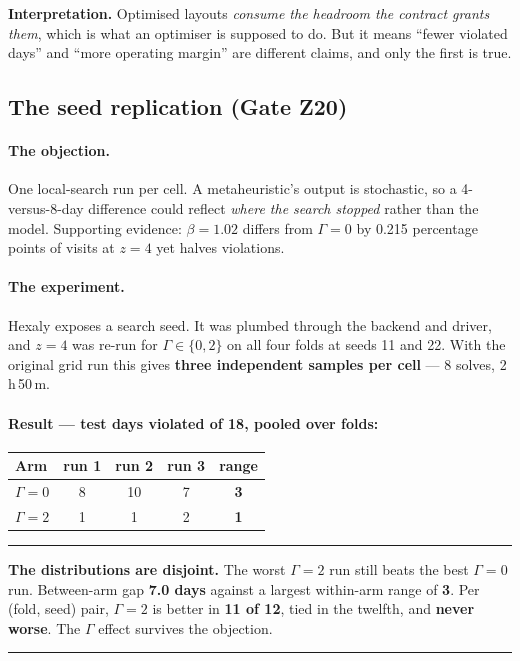 \documentclass[11pt,a4paper]{article}
\newenvironment{keybox}
  {\par\medskip\noindent\rule{\linewidth}{0.9pt}\par\nobreak\smallskip\ignorespaces}
  {\par\smallskip\nobreak\noindent\rule{\linewidth}{0.9pt}\par\medskip}
\begin{document}
\textbf{Interpretation.} Optimised layouts \emph{consume the headroom the
contract grants them}, which is what an optimiser is supposed to do. But it
means ``fewer violated days'' and ``more operating margin'' are different
claims, and only the first is true.

\subsection{The seed replication (Gate Z20)}

\paragraph{The objection.} One local-search run per cell. A metaheuristic's
output is stochastic, so a 4-versus-8-day difference could reflect
\emph{where the search stopped} rather than the model. Supporting evidence:
$\beta{=}1.02$ differs from $\Gamma=0$ by 0.215 percentage points of visits at
$z=4$ yet halves violations.

\paragraph{The experiment.} Hexaly exposes a search seed. It was plumbed
through the backend and driver, and $z=4$ was re-run for $\Gamma\in\{0,2\}$ on
all four folds at seeds 11 and 22. With the original grid run this gives
\textbf{three independent samples per cell} --- 8 solves, 2\,h\,50\,m.

\paragraph{Result --- test days violated of 18, pooled over folds:}

\begin{center}
\begin{tabular}{lcccc}
\toprule
Arm & run 1 & run 2 & run 3 & range \\
\midrule
$\Gamma=0$ & 8 & 10 & 7 & \textbf{3} \\
$\Gamma=2$ & 1 & 1  & 2 & \textbf{1} \\
\bottomrule
\end{tabular}
\end{center}

\begin{keybox}
\textbf{The distributions are disjoint.} The worst $\Gamma=2$ run still beats
the best $\Gamma=0$ run. Between-arm gap \textbf{7.0 days} against a largest
within-arm range of \textbf{3}. Per (fold, seed) pair, $\Gamma=2$ is better in
\textbf{11 of 12}, tied in the twelfth, and \textbf{never worse}. The $\Gamma$
effect survives the objection.
\end{keybox}
\end{document}
